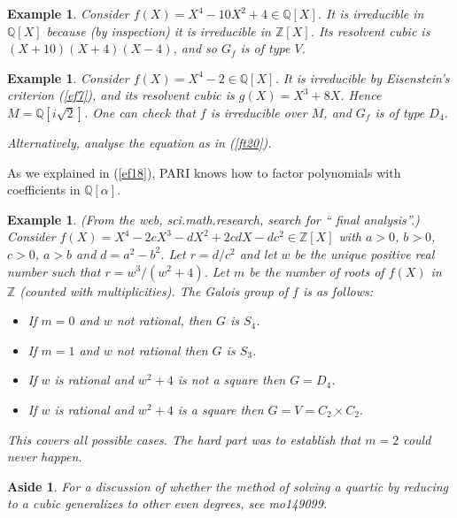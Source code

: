 \documentclass[a4paper,11pt,final,openany]{memoir}
\newtheorem{example}[X]{Example}
\newtheorem{aside}[X]{Aside}
\theoremstyle{nonumberplain}
\begin{document}
\begin{example}
\label{cg10}Consider $f(X)=X^{4}-10X^{2}+4\in\mathbb{Q}[X]$. It is irreducible
in $\mathbb{Q}{}[X]$ because (by inspection) it is irreducible in
$\mathbb{Z}{}[X]$. Its resolvent cubic is $(X+10)(X+4)(X-4)$, and so $G_{f}$
is of type $V$.
\end{example}

\begin{example}
\label{cg11}Consider $f(X)=X^{4}-2\in\mathbb{Q}[X]$. It is irreducible by
Eisenstein's criterion (\ref{ef7}), and its resolvent cubic is $g(X)=X^{3}%
+8X$. Hence $M=\mathbb{Q}[i\sqrt{2}]$. One can check that $f$ is irreducible
over $M$, and $G_{f}$ is of type $D_{4}$.

Alternatively, analyse the equation as in (\ref{ft20}).
\end{example}

As we explained in (\ref{ef18}), PARI%
knows how to factor polynomials with coefficients in $\mathbb{Q}[\alpha]$.

\begin{example}
\label{cg11a}(From the web, sci.math.research, search for \textquotedblleft
final analysis\textquotedblright.) Consider $f(X)=X^{4}-2cX^{3}-dX^{2}%
+2cdX-dc^{2}\in\mathbb{Z}{}[X]$ with $a>0$, $b>0$, $c>0$, $a>b$ and
$d=a^{2}-b^{2}$. Let $r=d/c^{2}$ and let $w$ be the unique positive real
number such that $r=w^{3}/(w^{2}+4)$. Let $m$ be the number of roots of $f(X)$
in $\mathbb{Z}{}$ (counted with multiplicities). The Galois group of $f$ is as follows:

\begin{itemize}
\item If $m=0$ and $w$ not rational, then $G$ is $S_{4}$.

\item If $m=1$ and $w$ not rational then $G$ is $S_{3}$.

\item If $w$ is rational and $w^{2}+4$ is not a square then $G=D_{4}$.

\item If $w$ is rational and $w^{2}+4$ is a square then $G=V=C_{2}\times
C_{2}.$
\end{itemize}

\noindent This covers all possible cases. The hard part was to establish that
$m=2$ could never happen.
\end{example}

\begin{aside}
\label{cg11b}For a discussion of whether the method of solving a quartic by
reducing to a cubic generalizes to other even degrees, see mo149099.
\end{aside}
\end{document}
